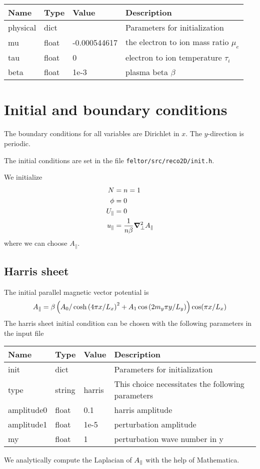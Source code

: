 \begin{longtable}{llll}
\toprule
\rowcolor{gray!50}\textbf{Name} &  \textbf{Type} & \textbf{Value}  & \textbf{Description}  \\ \midrule
physical &  dict &   & Parameters for initialization \\
\qquad mu      & float & -0.000544617 & the electron to ion mass ratio $\mu_e$ \\
\qquad tau  & float &  0    &  electron to ion temperature $\tau_i$ \\
\qquad beta  & float &  1e-3    &  plasma beta $\beta$ \\
\bottomrule
\end{longtable}

\section{Initial and boundary conditions}
The boundary conditions for all variables are Dirichlet in $x$.
The $y$-direction is periodic.

The initial conditions are set in the file \texttt{feltor/src/reco2D/init.h}.

We initialize
\begin{align}
 N&=n =1 \\
 \phi &= 0 \\
  U_\parallel&=0 \\
  u_\parallel &= \frac{1}{n  \beta }{\boldsymbol{\nabla}}^2_{\perp} A_\parallel
\end{align}
where we can choose $A_\parallel$.
\subsection{Harris sheet}
The initial parallel magnetic vector potential is
\begin{align}
    A_\parallel =\beta\left( A_0 / \cosh{( 4  \pi x / L_x )}^2 +A_1\cos{(2 m_y\pi y/L_y)}\right) \cos( \pi x /L_x)
\end{align}
The harris sheet initial condition can be chosen with the following parameters in the input file
\begin{longtable}{llll}
\toprule
\rowcolor{gray!50}\textbf{Name} &  \textbf{Type} & \textbf{Value}  & \textbf{Description}  \\ \midrule
init &  dict &   & Parameters for initialization \\
\qquad type      & string & harris & This choice necessitates the following parameters \\
\qquad amplitude0  & float &  0.1     &  harris amplitude \\
\qquad amplitude1  & float &  1e-5    &  perturbation amplitude \\
\qquad my          & float &  1       &  perturbation wave number in y\\
\bottomrule
\end{longtable}
We analytically compute the Laplacian of $A_\parallel$ with the help of Mathematica.
